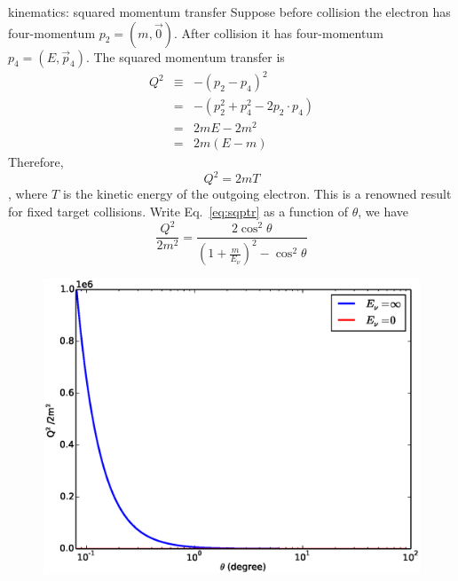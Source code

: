 \documentclass{beamer}
\begin{document}
\begin{frame}[allowframebreaks]{kinematics: squared momentum transfer}
\scriptsize
Suppose before collision the electron has four-momentum $p_2=(m,\vec{0})$. After collision it has four-momentum $p_4=(E,\vec{p}_4)$. The squared momentum transfer is
\begin{eqnarray*}
  Q^2 & \equiv & -(p_2-p_4)^2 \\
  &=&-(p_2^2+p_4^2-2p_2\cdot p_4) \\
  &=&2mE-2m^2 \\
  &=&2m(E-m)
\end{eqnarray*}
Therefore,
\begin{equation} \label{eq:sqptr}
  \boxed{Q^2=2mT}
\end{equation}
, where $T$ is the kinetic energy of the outgoing electron. This is a renowned result for fixed target collisions. Write Eq.~\eqref{eq:sqptr} as a function of $\theta$, we have
\begin{equation}
  \frac{Q^2}{2m^2}=\frac{2\cos^2\theta}{\left( 1+\frac{m}{E_\nu} \right)^2-\cos^2\theta}
\end{equation}

\framebreak
\begin{figure}
\centering
  \includegraphics[width=.9\textwidth]{figures/Q2.eps}
\end{figure}

\end{frame}
\end{document}
